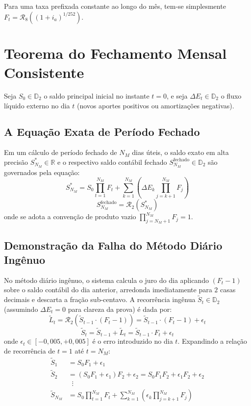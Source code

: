 \documentclass[11pt, a4paper]{article}
\begin{document}
Para uma taxa prefixada constante ao longo do mês, tem-se simplesmente $F_t = \mathcal{R}_8\left((1 + i_a)^{1/252}\right)$.

\section{Teorema do Fechamento Mensal Consistente}

Seja $S_0 \in \mathbb{D}_2$ o saldo principal inicial no instante $t = 0$, e seja $\Delta E_t \in \mathbb{D}_2$ o fluxo líquido externo no dia $t$ (novos aportes positivos ou amortizações negativas).

\subsection{A Equação Exata de Período Fechado}

Em um cálculo de período fechado de $N_M$ dias úteis, o saldo exato em alta precisão $S_{N_M}^{*} \in \mathbb{R}$ e o respectivo saldo contábil fechado $S_{N_M}^{\text{fechado}} \in \mathbb{D}_2$ são governados pela equação:
\begin{equation}
    S_{N_M}^{*} = S_0 \prod_{t=1}^{N_M} F_t + \sum_{k=1}^{N_M} \left( \Delta E_k \prod_{j=k+1}^{N_M} F_j \right)
\end{equation}
\begin{equation}
    S_{N_M}^{\text{fechado}} = \mathcal{R}_2 \left( S_{N_M}^{*} \right)
\end{equation}
onde se adota a convenção de produto vazio $\prod_{j=N_M+1}^{N_M} F_j = 1$.

\subsection{Demonstração da Falha do Método Diário Ingênuo}

No método diário ingênuo, o sistema calcula o juro do dia aplicando $(F_t - 1)$ sobre o saldo contábil do dia anterior, arredonda imediatamente para $2$ casas decimais e descarta a fração sub-centavo. A recorrência ingênua $\tilde{S}_t \in \mathbb{D}_2$ (assumindo $\Delta E_t = 0$ para clareza da prova) é dada por:
\begin{equation}
    \tilde{L}_t = \mathcal{R}_2 \left( \tilde{S}_{t-1} \cdot (F_t - 1) \right) = \tilde{S}_{t-1} \cdot (F_t - 1) + \epsilon_t
\end{equation}
\begin{equation}
    \tilde{S}_t = \tilde{S}_{t-1} + \tilde{L}_t = \tilde{S}_{t-1} \cdot F_t + \epsilon_t
\end{equation}
onde $\epsilon_t \in [-0{,}005, +0{,}005]$ é o erro introduzido no dia $t$. Expandindo a relação de recorrência de $t = 1$ até $t = N_M$:
\begin{align}
    \tilde{S}_1 &= S_0 F_1 + \epsilon_1 \\
    \tilde{S}_2 &= (S_0 F_1 + \epsilon_1) F_2 + \epsilon_2 = S_0 F_1 F_2 + \epsilon_1 F_2 + \epsilon_2 \\
    &\;\;\vdots \nonumber \\
    \tilde{S}_{N_M} &= S_0 \prod_{t=1}^{N_M} F_t + \sum_{k=1}^{N_M} \left( \epsilon_k \prod_{j=k+1}^{N_M} F_j \right)
\end{align}
\end{document}
